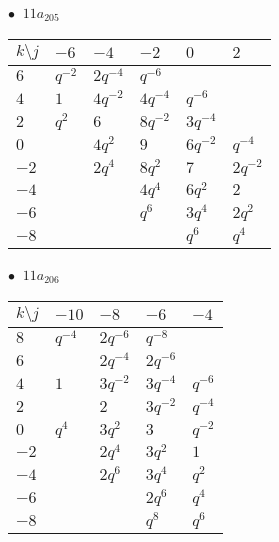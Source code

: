 \begin{minipage}{\linewidth}
$\bullet\ $ $11a_{205}$ \vspace{0.5em} \\
\begin{tabular}{l|lllll}
$k \setminus j$ & $-6$ & $-4$ & $-2$ & $0$ & $2$ \\
\hline
$6$ & $q^{-2}$ & $2q^{-4}$ & $q^{-6}$ &  &  \\
$4$ & $1$ & $4q^{-2}$ & $4q^{-4}$ & $q^{-6}$ &  \\
$2$ & $q^{2}$ & $6$ & $8q^{-2}$ & $3q^{-4}$ &  \\
$0$ &  & $4q^{2}$ & $9$ & $6q^{-2}$ & $q^{-4}$ \\
$-2$ &  & $2q^{4}$ & $8q^{2}$ & $7$ & $2q^{-2}$ \\
$-4$ &  &  & $4q^{4}$ & $6q^{2}$ & $2$ \\
$-6$ &  &  & $q^{6}$ & $3q^{4}$ & $2q^{2}$ \\
$-8$ &  &  &  & $q^{6}$ & $q^{4}$ \\
\end{tabular}
\vspace{2em}
\end{minipage}
%
\begin{minipage}{\linewidth}
$\bullet\ $ $11a_{206}$ \vspace{0.5em} \\
\begin{tabular}{l|llll}
$k \setminus j$ & $-10$ & $-8$ & $-6$ & $-4$ \\
\hline
$8$ & $q^{-4}$ & $2q^{-6}$ & $q^{-8}$ &  \\
$6$ &  & $2q^{-4}$ & $2q^{-6}$ &  \\
$4$ & $1$ & $3q^{-2}$ & $3q^{-4}$ & $q^{-6}$ \\
$2$ &  & $2$ & $3q^{-2}$ & $q^{-4}$ \\
$0$ & $q^{4}$ & $3q^{2}$ & $3$ & $q^{-2}$ \\
$-2$ &  & $2q^{4}$ & $3q^{2}$ & $1$ \\
$-4$ &  & $2q^{6}$ & $3q^{4}$ & $q^{2}$ \\
$-6$ &  &  & $2q^{6}$ & $q^{4}$ \\
$-8$ &  &  & $q^{8}$ & $q^{6}$ \\
\end{tabular}
\vspace{2em}
\end{minipage}
%

